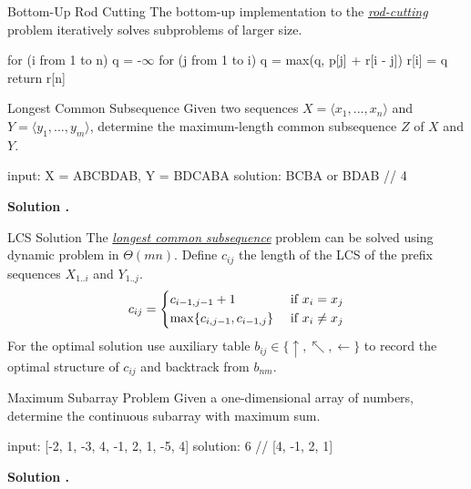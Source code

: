 \documentclass{cognito}
\begin{document}
\begin{note}{Bottom-Up Rod Cutting}
	The bottom-up implementation  to the \hyperref[note:Rod Cutting Problem]{\it rod-cutting} problem
	 iteratively solves subproblems of larger size. 
	 
	 \begin{largecode}
 for (i from 1 to n)
 	q = -$\infty$
	for (j from 1 to i)
		q = max(q, p[j] + r[i - j])
	r[i] = q
 return r[n]
	\end{largecode}
	\vspace{-5pt}
\end{note}

\begin{note}{Longest Common Subsequence}
	Given two sequences $X = \langle x_1, ..., x_n \rangle$ and $Y = \langle y_1, ..., y_m \rangle $, determine the maximum-length common subsequence $Z$ of $X$ and $Y$.
	\begin{largecode}
 input:    X = ABCBDAB, Y = BDCABA
 solution: BCBA or BDAB  // 4
	\end{largecode}
	\bf Solution \hyperref[note:LCS Solution]{\solutionref}.
\end{note}

\begin{note}{LCS Solution}
	The \hyperref[note:Longest Common Subsequence]{\it longest common subsequence} problem can be solved using dynamic problem in $\Theta(mn)$.
	Define $c_{ij}$ the length of the LCS of the prefix sequences $X_{1..i}$ and $Y_{1..j}$.
	$$
		c_{ij} = \begin{dcases}
			c_{i-1,j-1} + 1 & \text{ if } x_i = x_j\\
			\max\{ c_{i,j-1}, c_{i-1,j} \} & \text{ if } x_i \neq x_j
		\end{dcases}
	$$
	For the optimal solution use auxiliary table $b_{ij} \in \{\uparrow, \nwarrow, \leftarrow \}$ to record
	the optimal structure of $c_{ij}$ and backtrack from $b_{nm}$.
\end{note}



\begin{note}{Maximum Subarray Problem}
	Given a one-dimensional array of numbers, determine the continuous subarray with maximum sum.
	\begin{largecode}
 input: [-2, 1, -3, 4, -1, 2, 1, -5, 4]
 solution: 6  // [4, -1, 2, 1]
	\end{largecode}
	\bf Solution \hyperref[note:Kadane's Algorithm]{\solutionref}.
\end{note}
\end{document}
